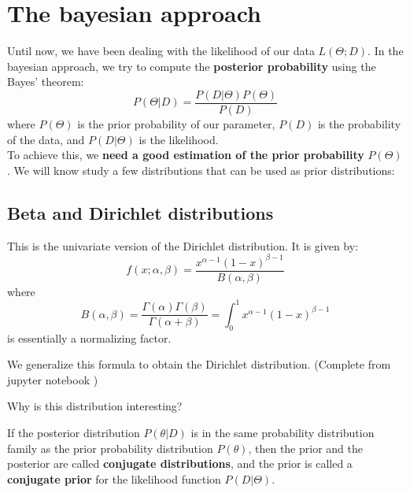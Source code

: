 
\section{The bayesian approach}

Until now, we have been dealing with the likelihood of our data \(L(\Theta ;D)\). In the bayesian approach, we try to compute the \textbf{posterior probability} using the Bayes' theorem:
\[
    P(\Theta|D) = \frac{P(D|\Theta)P(\Theta)}{P(D)}
\]
where \(P(\Theta)\) is the prior probability of our parameter, \(P(D)\) is the probability of the data, and \(P(D|\Theta)\) is the likelihood.\\

To achieve this, we \textbf{need a good estimation of the prior probability} \(P(\Theta)\). We will know study a few distributions that can be used as prior distributions:

\subsection{Beta and Dirichlet distributions}

This is the univariate version of the Dirichlet distribution. It is given by:
\[
    f(x;\alpha,\beta) = \frac{x^{\alpha-1}(1-x)^{\beta-1}}{B(\alpha,\beta)}
\]
where
\[
    B(\alpha,\beta) = \frac{\Gamma(\alpha)\Gamma(\beta)}{\Gamma(\alpha+\beta)} = \int_{0}^{1}x^{\alpha-1}(1-x)^{\beta - 1}
\]
is essentially a normalizing factor.

We generalize this formula to obtain the Dirichlet distribution. (Complete from jupyter notebook )

Why is this distribution interesting?

\begin{ndef} If the posterior distribution \(P(\theta|D)\) is in the same probability distribution family as the prior probability distribution \(P(\theta)\), then the prior and the posterior are called \textbf{conjugate distributions}, and the prior is called a \textbf{conjugate prior} for the likelihood function \(P(D|\Theta)\).
\end{ndef}

